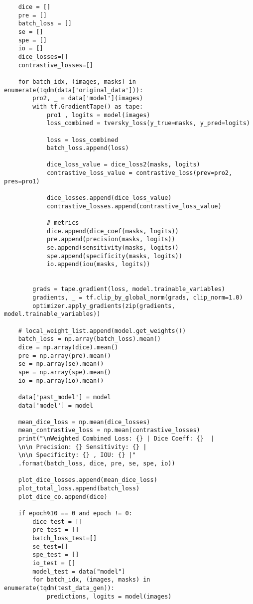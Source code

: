 \begin{verbatim}
    dice = []
    pre = []
    batch_loss = []
    se = []
    spe = []
    io = []
    dice_losses=[]
    contrastive_losses=[]

    for batch_idx, (images, masks) in enumerate(tqdm(data['original_data'])):
        pro2, _ = data['model'](images)
        with tf.GradientTape() as tape:
            pro1 , logits = model(images)
            loss_combined = tversky_loss(y_true=masks, y_pred=logits)

            loss = loss_combined
            batch_loss.append(loss)

            dice_loss_value = dice_loss2(masks, logits)
            contrastive_loss_value = contrastive_loss(prev=pro2, pres=pro1)

            dice_losses.append(dice_loss_value)
            contrastive_losses.append(contrastive_loss_value)

            # metrics
            dice.append(dice_coef(masks, logits))
            pre.append(precision(masks, logits))
            se.append(sensitivity(masks, logits))
            spe.append(specificity(masks, logits))
            io.append(iou(masks, logits))


        grads = tape.gradient(loss, model.trainable_variables)
        gradients, _ = tf.clip_by_global_norm(grads, clip_norm=1.0)
        optimizer.apply_gradients(zip(gradients, model.trainable_variables))

    # local_weight_list.append(model.get_weights())
    batch_loss = np.array(batch_loss).mean()
    dice = np.array(dice).mean()
    pre = np.array(pre).mean()
    se = np.array(se).mean()
    spe = np.array(spe).mean()
    io = np.array(io).mean()

    data['past_model'] = model
    data['model'] = model

    mean_dice_loss = np.mean(dice_losses)
    mean_contrastive_loss = np.mean(contrastive_losses)
    print("\nWeighted Combined Loss: {} | Dice Coeff: {}  |
    \n\n Precision: {} Sensitivity: {} | 
    \n\n Specificity: {} , IOU: {} |"
    .format(batch_loss, dice, pre, se, spe, io))
    
    plot_dice_losses.append(mean_dice_loss)
    plot_total_loss.append(batch_loss)
    plot_dice_co.append(dice)

    if epoch%10 == 0 and epoch != 0:
        dice_test = []
        pre_test = []
        batch_loss_test=[]
        se_test=[]
        spe_test = []
        io_test = []
        model_test = data["model"]
        for batch_idx, (images, masks) in enumerate(tqdm(test_data_gen)):
            predictions, logits = model(images)


\end{verbatim}
